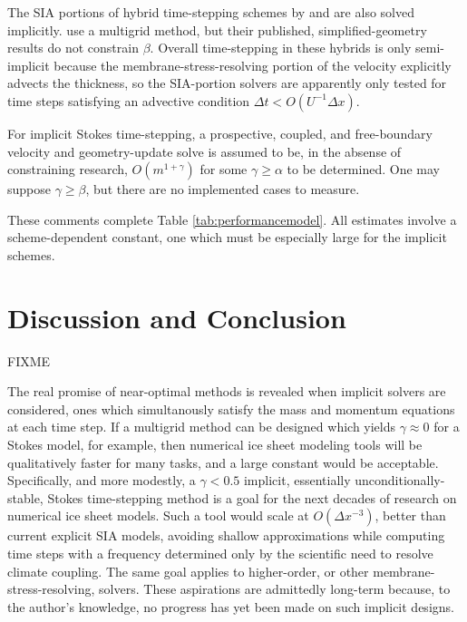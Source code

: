 \documentclass[twocolumn,letterpaper]{igs}
\begin{document}
The SIA portions of hybrid time-stepping schemes by \cite{JouvetGraeser2013} and \cite{BrinkerhoffJohnson2015} are also solved implicitly.  \cite{JouvetGraeser2013} use a multigrid method, but their published, simplified-geometry results do not constrain $\beta$.  Overall time-stepping in these hybrids is only semi-implicit because the membrane-stress-resolving portion of the velocity explicitly advects the thickness, so the SIA-portion solvers are apparently only tested for time steps satisfying an advective condition $\Delta t < O(U^{-1}\Delta x)$.

For implicit Stokes time-stepping, a prospective, coupled, and free-boundary velocity and geometry-update solve is assumed to be, in the absense of constraining research, $O(m^{1+\gamma})$ for some $\gamma \ge \alpha$ to be determined.  One may suppose $\gamma\ge \beta$, but there are no implemented cases to measure.


These comments complete Table \ref{tab:performancemodel}.  All estimates involve a scheme-dependent constant, one which must be especially large for the implicit schemes.


\section{Discussion and Conclusion}

FIXME

The real promise of near-optimal methods is revealed when implicit solvers are considered, ones which simultanously satisfy the mass and momentum equations at each time step.  If a multigrid method can be designed which yields $\gamma\approx 0$ for a Stokes model, for example, then numerical ice sheet modeling tools will be qualitatively faster for many tasks, and a large constant would be acceptable.  Specifically, and more modestly, a $\gamma < 0.5$ implicit, essentially unconditionally-stable, Stokes time-stepping method is a goal for the next decades of research on numerical ice sheet models.  Such a tool would scale at $O(\Delta x^{-3})$, better than current explicit SIA models, avoiding shallow approximations while computing time steps with a frequency determined only by the scientific need to resolve climate coupling.  The same goal applies to higher-order, or other membrane-stress-resolving, solvers.   These aspirations are admittedly long-term because, to the author's knowledge, no progress has yet been made on such implicit designs.



\end{document}
